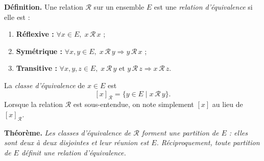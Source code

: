 ﻿%



\begin{tcolorbox}[thmbox]
  \textbf{Définition.}\enspace%
  Une relation $\mathcal{R}$ sur un ensemble $E$ est une
  \emph{relation d'équivalence} si elle est :
  \begin{enumerate}
    \item \textbf{Réflexive :} $\forall x \in E,\; x\,\mathcal{R}\,x$ ;
    \item \textbf{Symétrique :} $\forall x,y \in E,\; x\,\mathcal{R}\,y \Rightarrow y\,\mathcal{R}\,x$ ;
    \item \textbf{Transitive :} $\forall x,y,z \in E,\; x\,\mathcal{R}\,y \text{ et } y\,\mathcal{R}\,z \Rightarrow x\,\mathcal{R}\,z$.
  \end{enumerate}
  La \emph{classe d'équivalence} de $x \in E$ est
  \[
    [x]_{\mathcal{R}} = \bigl\{y \in E \mid x\,\mathcal{R}\,y\bigr\}.
  \]
  Lorsque la relation $\mathcal{R}$ est sous-entendue, on note simplement $[x]$
  au lieu de $[x]_{\mathcal{R}}$.
\end{tcolorbox}


\begin{tcolorbox}[thmbox]
  \textbf{Théorème.}\enspace%
  \textit{Les classes d'équivalence de $\mathcal{R}$ forment une
  \emph{partition} de $E$ : elles sont deux à deux disjointes et leur
  réunion est $E$. Réciproquement, toute partition de $E$ définit
  une relation d'équivalence.}
\end{tcolorbox}

